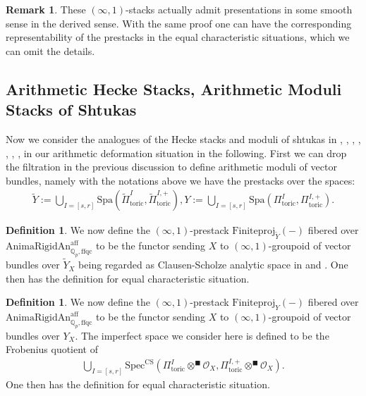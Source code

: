 \documentclass[12pt]{article}
\theoremstyle{definition}
\newtheorem{definition}[theorem]{Definition}
\newtheorem{remark}[theorem]{Remark}
\numberwithin{equation}{section}
\begin{document}
\begin{remark}
These $(\infty,1)$-stacks actually admit presentations in some smooth sense in the derived sense. With the same proof one can have the corresponding representability of the prestacks in the equal characteristic situations, which we can omit the details.
\end{remark}


\subsection{Arithmetic Hecke Stacks, Arithmetic Moduli Stacks of Shtukas}

Now we consider the analogues of the Hecke stacks and moduli of shtukas in \cite{Laff}, \cite{Dr}, \cite{Dr1}, \cite{SW}, \cite{RZ}, \cite{G}, \cite{A}, \cite{La} in our arithmetic deformation situation in the following. First we can drop the filtration in the previous discussion to define arithmetic moduli of vector bundles, namely with the notations above we have the prestacks over the spaces:
\begin{align}
\widetilde{Y}:=\bigcup_{I=[s,r]}\mathrm{Spa}(\widetilde{\Pi}^I_{\mathrm{toric}},\widetilde{\Pi}_{\mathrm{toric}}^{I,+}), Y:=\bigcup_{I=[s,r]}\mathrm{Spa}({\Pi}^I_{\mathrm{toric}},{\Pi}_{\mathrm{toric}}^{I,+}). 	
\end{align}


\begin{definition}
We now define the $(\infty,1)$-prestack $\mathrm{Finiteproj}_{\widetilde{Y}}(-)$ fibered over $\mathrm{AnimaRigidAn}^\mathrm{aff}_{\mathbb{Q}_p,\mathrm{ffqc}}$ to be the functor sending $X$ to $(\infty,1)$-groupoid of vector bundles over $\widetilde{Y}_X$ being regarded as Clausen-Scholze analytic space in \cite{CS1} and \cite{CS2}. One then has the definition for equal characteristic situation. 
\end{definition}


\begin{definition}
We now define the $(\infty,1)$-prestack $\mathrm{Finiteproj}_{{Y}}(-)$ fibered over $\mathrm{AnimaRigidAn}^\mathrm{aff}_{\mathbb{Q}_p,\mathrm{ffqc}}$ to be the functor sending $X$ to $(\infty,1)$-groupoid of vector bundles over ${Y}_X$. The imperfect space we consider here is defined to be the Frobenius quotient of
\begin{align}
\bigcup_{I=[s,r]}\mathrm{Spec}^\mathrm{CS}({\Pi}^I_{\mathrm{toric}}\otimes^\blacksquare \mathcal{O}_X,{\Pi}_{\mathrm{toric}}^{I,+}\otimes^\blacksquare \mathcal{O}_X).	
\end{align}
One then has the definition for equal characteristic situation. 
\end{definition}
\end{document}
